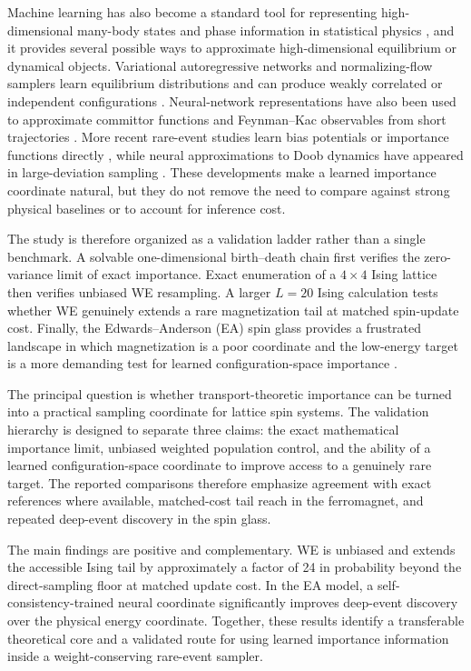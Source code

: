 \documentclass[a4paper,fleqn]{cas-sc}
\begin{document}
Machine learning has also become a standard tool for representing high-dimensional many-body states and phase information in statistical physics \citep{carleo2017,carrasquilla2017}, and it provides several possible ways to approximate high-dimensional equilibrium or dynamical objects. Variational autoregressive networks and normalizing-flow samplers learn equilibrium distributions and can produce weakly correlated or independent configurations \citep{wu2019,noe2019,nicoli2020,gabrie2022}. Neural-network representations have also been used to approximate committor functions and Feynman--Kac observables from short trajectories \citep{khoo2019,strahan2023}. More recent rare-event studies learn bias potentials or importance functions directly \citep{hua2024,kimcai2026}, while neural approximations to Doob dynamics have appeared in large-deviation sampling \citep{zhao2025}. These developments make a learned importance coordinate natural, but they do not remove the need to compare against strong physical baselines or to account for inference cost.

The study is therefore organized as a validation ladder rather than a single benchmark. A solvable one-dimensional birth--death chain first verifies the zero-variance limit of exact importance. Exact enumeration of a $4\times4$ Ising lattice then verifies unbiased WE resampling. A larger $L=20$ Ising calculation tests whether WE genuinely extends a rare magnetization tail at matched spin-update cost. Finally, the Edwards--Anderson (EA) spin glass provides a frustrated landscape in which magnetization is a poor coordinate and the low-energy target is a more demanding test for learned configuration-space importance \citep{ising1925,onsager1944,edwards1975,binder1986}.

The principal question is whether transport-theoretic importance can be turned into a practical sampling coordinate for lattice spin systems. The validation hierarchy is designed to separate three claims: the exact mathematical importance limit, unbiased weighted population control, and the ability of a learned configuration-space coordinate to improve access to a genuinely rare target. The reported comparisons therefore emphasize agreement with exact references where available, matched-cost tail reach in the ferromagnet, and repeated deep-event discovery in the spin glass.

The main findings are positive and complementary. WE is unbiased and extends the accessible Ising tail by approximately a factor of 24 in probability beyond the direct-sampling floor at matched update cost. In the EA model, a self-consistency-trained neural coordinate significantly improves deep-event discovery over the physical energy coordinate. Together, these results identify a transferable theoretical core and a validated route for using learned importance information inside a weight-conserving rare-event sampler.
\end{document}
